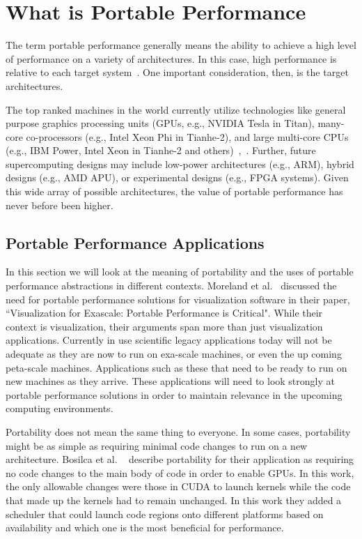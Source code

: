 \section{\textbf{What is Portable Performance}}
\label{sec:whatispp}

The term portable performance generally means the ability to achieve a high level of performance on a variety of architectures.
%
In this case, high performance is relative to each target system~\cite{michaelwolfe2016}.
%
One important consideration, then, is the target architectures.
%

%
The top ranked machines in the world currently utilize technologies like general purpose graphics processing units (GPUs, e.g., NVIDIA Tesla in Titan), many-core co-processors (e.g., Intel Xeon Phi in Tianhe-2), and large multi-core CPUs (e.g., IBM Power, Intel Xeon in Tianhe-2 and others)~\cite{michaelwolfe2016},~\cite{top500thelist2016}. 
%
Further, future supercomputing designs may include low-power architectures (e.g., ARM), hybrid designs (e.g., AMD APU), or experimental designs (e.g., FPGA systems). 
%
Given this wide array of possible architectures, the value of portable performance has never before been higher.
%

\subsection{\textbf{Portable Performance Applications}}

In this section we will look at the meaning of portability and the uses of portable performance abstractions in different contexts.
%
Moreland et al.~\cite{moreland2015visualization} discussed the need for portable performance solutions for visualization software in their paper, ``Visualization for Exascale: Portable Performance is Critical".
%
While their context is visualization, their arguments span more than just visualization applications.
%
Currently in use scientific legacy applications today will not be adequate as they are now to run on exa-scale machines, or even the up coming peta-scale machines.
%
Applications such as these that need to be ready to run on new machines as they arrive.
%
These applications will need to look strongly at portable performance solutions in order to maintain relevance in the upcoming computing environments.

Portability does not mean the same thing to everyone.
%
In some cases, portability might be as simple as requiring minimal code changes to run on a new architecture.
%
Bosilca et al. ~\cite{bosilca2011performance} describe portability for their application as requiring no code changes to the main body of code in order to enable GPUs.
%
In this work, the only allowable changes were those in CUDA to launch kernels while the code that made up the kernels had to remain unchanged.
%
In this work they added a scheduler that could launch code regions onto different platforms based on availability and which one is the most beneficial for performance.

